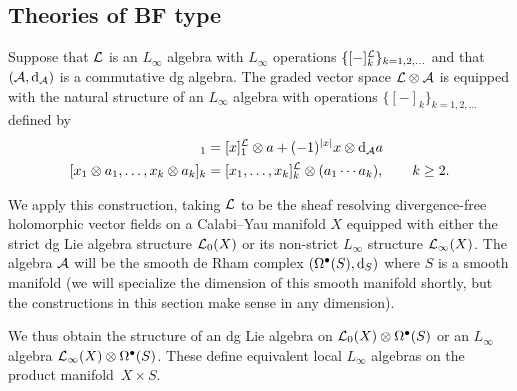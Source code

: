 



\subsection{Theories of BF type}

\parsec
Suppose that $\mathcal L$ is an $L_\infty$ algebra with $L_\infty$ operations $\{[-]^\mathcal L_k\}_{k=1,2,\ldots}$ and that $(\mathcal A, {\rm d}_\mathcal A)$ is a commutative dg algebra. 
The graded vector space $\mathcal L \otimes \mathcal A$ is equipped with the natural structure of an $L_\infty$ algebra with operations $\{[-]_k\}_{k=1,2,\ldots}$ defined by
\begin{align*}
[x \otimes a]_1 & = [x]^\cL_1 \otimes a + (-1)^{|x|} x \otimes \d_\cA a \\
[x_1 \otimes a_1, \ldots , x_k \otimes a_k]_k & = [x_1,\ldots,x_k]^\cL_k \otimes (a_1 \cdots a_k), \qquad k \geq 2 .
\end{align*}

We apply this construction, taking $\mathcal L$ to be the sheaf resolving divergence-free holomorphic vector fields on a Calabi--Yau manifold $X$ equipped with either the strict dg Lie algebra structure $\mathcal L_0(X)$ or its non-strict $L_\infty$ structure $\mathcal L_\infty (X)$. 
The algebra $\mathcal A$ will be the smooth de Rham complex $(\Omega^\bullet(S) , {\rm d}_S)$ where $S$ is a smooth manifold (we will specialize the dimension of this smooth manifold shortly, but the constructions in this section make sense in any dimension). 

We thus obtain the structure of an dg Lie algebra on $\mathcal L_0(X) \otimes \Omega^{\bullet}(S)$ or an $L_\infty$ algebra $\mathcal L_\infty(X) \otimes \Omega^\bullet(S)$.
These define equivalent local $L_\infty$ algebras on the product manifold~$X \times S$. 

